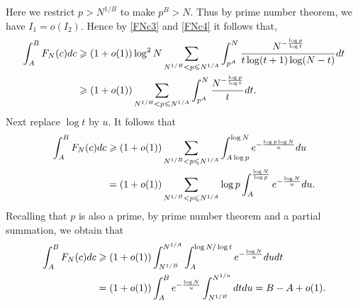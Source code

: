 \documentclass[12pt, reqno, twoside, letterpaper]{amsart}
\numberwithin{equation}{section}
\theoremstyle{customthm}
\theoremstyle{customrem}
\def\int{\intop\nolimits}
\begin{document}
Here we restrict $p>N^{1/B}$ to make $p^B>N$. Thus by prime number theorem, we have $I_1 = o(I_2)$. Hence by \eqref{FNc3} and \eqref{FNc4} it follows that, 
\begin{align}
	\label{FNc5}
\nonumber \int_{A}^{B}F_N(c)dc &\geqslant (1+o(1))\log^2 N \sum_{N^{1/B} < p \leqslant N^{1/A}} \int_{p^A}^{N} \frac{N^{-\frac{\log p}{\log t}}}{t\log (t+1) \log (N-t)}dt \\
&\geqslant (1+o(1)) \sum_{N^{1/B} < p \leqslant N^{1/A}} \int_{p^A}^{N} \frac{N^{-\frac{\log p}{\log t}}}{t}dt.
\end{align}
Next replace $\log t$ by $u$. It follows that
\begin{align*}
\int_{A}^{B}F_N(c)dc &\geqslant (1+o(1))\sum_{ N^{1/B} < p \leqslant N^{1/A}} \int_{A\log p}^{\log N} e^{-\frac{\log p\log N}{u}}du \\
&= (1+o(1)) \sum_{ N^{1/B} < p \leqslant N^{1/A}} \log p \int_{A}^{\frac{\log N}{\log p}} e^{-\frac{\log N}{u}}du.
\end{align*}
Recalling that $p$ is also a prime, by prime number theorem and a partial summation, we obtain that
\begin{align}
	\label{FNc}
\nonumber \int_{A}^{B}F_N(c)dc &\geqslant (1+o(1))\int_{N^{1/B}}^{N^{1/A}} \int_{A}^{\log N / \log t} e^{-\frac{\log N}{u}}du dt \\
&= (1+o(1))\int_{A}^{B} e^{-\frac{\log N}{u}} \int_{N^{1/B}}^{N^{1/u}} dt du = B-A + o(1).
\end{align} 
\end{document}
